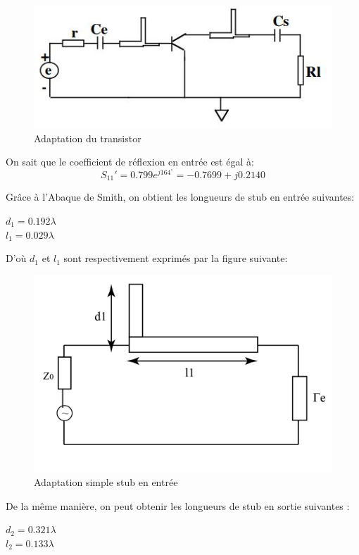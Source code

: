 \documentclass[french]{article}
\begin{document}
\begin{figure}[H]
	\centering
	\includegraphics[width=0.9\linewidth]{../5SynthAmp/adaptation_e_s}
	\caption{Adaptation du transistor}
	\label{fig:adaptation_e_s}
\end{figure}

On sait que le coefficient de réflexion en entrée est égal à:
\begin{equation}
	S_{11}'=0.799e^{j164^{\circ}}=-0.7699+j0.2140
\end{equation}

Grâce à l’Abaque de Smith, on obtient les longueurs de stub en entrée suivantes:

{\centering
	$d_{1}=0.192\lambda$\\
	$l_{1}=0.029\lambda$\\
}
	
D’où $d_{1}$ et $l_{1}$ sont respectivement exprimés par la figure suivante:
\begin{figure}[H]
	\centering
	\includegraphics[width=0.6\linewidth]{../5SynthAmp/simple_stub_e}
	\caption{Adaptation simple stub en entrée}
	\label{fig:simple_stub_e}
\end{figure}

De la même manière, on peut obtenir les longueurs de stub en sortie suivantes :
 
{\centering
	$d_{2}=0.321\lambda$\\
	$l_{2}=0.133\lambda$\\
}
\end{document}

